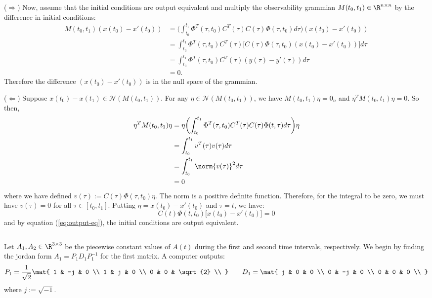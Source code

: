 \documentclass{homework}
\begin{document}
($\Rightarrow$) Now, assume that the initial conditions are output equivalent and 
multiply the observability grammian $M(t_0, t_1) \in \R^{n\times n}$
by the difference in initial conditions:
\begin{align*}
    M(t_0, t_1) (x(t_0) - x'(t_0)) &= \biggl(
        \int_{t_0}^{t_1} \Phi^T(\tau, t_0) C^T(\tau) C(\tau) \Phi(\tau, t_0) d\tau
    \biggr) (x(t_0) - x'(t_0)) \\
    &= \int_{t_0}^{t_1} \Phi^T(\tau, t_0) C^T(\tau) \biggl[
        C(\tau) \Phi(\tau, t_0) (x(t_0) - x'(t_0))
    \biggr]d\tau \\
    &= \int_{t_0}^{t_1} \Phi^T(\tau, t_0) C^T(\tau) (y(\tau) - y'(\tau)) d\tau \\
    &= 0.
\end{align*}
Therefore the difference $(x(t_0) - x'(t_0))$ is in the null space of the grammian.

\newcommand{\nul}{\mathcal{N}}

($\Leftarrow$) Suppose $x(t_0) - x(t_1) \in \nul(M(t_0, t_1))$.
For any $\eta\in\nul(M(t_0, t_1))$, we have $M(t_0, t_1)\eta = 0_n$ and $\eta^T M(t_0, t_1) \eta = 0$.
So then,
\begin{align*}
    \eta^T M(t_0, t_1) \eta &= \eta \biggl(
        \int_{t_0}^{t_1} \Phi^T(\tau, t_0) C^T(\tau)
            C(\tau) \Phi(t, \tau) d\tau
    \biggr) \eta \\
    &= \int_{t_0}^{t_1} v^T(\tau) v(\tau) d\tau \\
    &= \int_{t_0}^{t_1} \norm{v(\tau)}^2 d\tau \\
    &= 0
\end{align*}
where we have defined $v(\tau) := C(\tau) \Phi(\tau, t_0) \eta$.
The norm is a positive definite function.
Therefore, for the integral to be zero, we must have $v(\tau) = 0$ for all
$\tau \in [t_0, t_1]$. Putting $\eta = x(t_0) - x'(t_0)$  and $\tau=t$,
we have:
\begin{equation*}
    C(t) \Phi(t, t_0) \biggl[
        x(t_0) - x'(t_0)
    \biggr] = 0
\end{equation*}
and by equation (\ref{eq:output-eq}), the initial conditions are 
output equivalent.

\subsection{}

Let $A_1, A_2 \in\R^{3\times 3}$ be the piecewise constant values of
$A(t)$ during the first and second time intervals, respectively. We begin by finding
the jordan form $A_1 = P_1 D_1 P_1^{-1}$ for the first matrix. A computer
outputs:
\begin{equation*}
    P_1 = \frac{1}{\sqrt{2}} \mat{
        1 & -j & 0 \\
        1 & j & 0 \\
        0 & 0 & \sqrt{2} \\
    } \qquad D_1 = \mat{
        j & 0 & 0 \\
        0 & -j & 0 \\
        0 & 0 & 0 \\
    }
\end{equation*}
where $j := \sqrt{-1}$.
\end{document}
